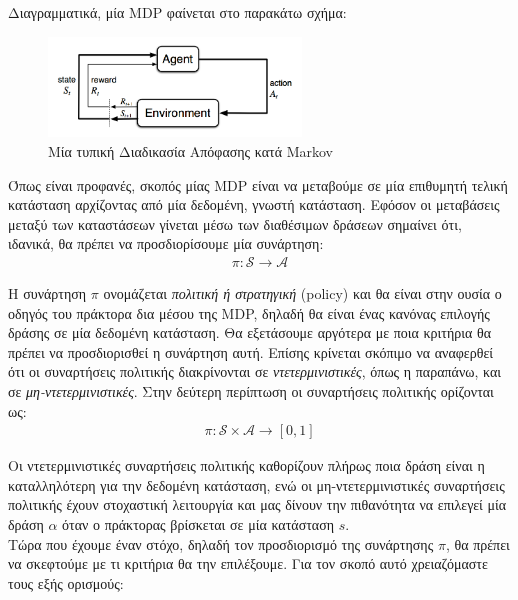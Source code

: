 \documentclass[11pt]{article} %
\numberwithin{equation}{subsection}
\begin{document}
Διαγραμματικά, μία MDP φαίνεται στο παρακάτω σχήμα:\\
\begin{figure}[h]
    \centering
    \includegraphics[width=0.6\textwidth]{mdp}
    \caption{Μία τυπική Διαδικασία Απόφασης κατά Markov}
    \label{fig:mdp}
\end{figure}

Όπως είναι προφανές, σκοπός μίας MDP είναι να μεταβούμε σε μία επιθυμητή τελική κατάσταση αρχίζοντας από μία δεδομένη, γνωστή κατάσταση. Εφόσον οι μεταβάσεις μεταξύ των καταστάσεων γίνεται μέσω των διαθέσιμων δράσεων σημαίνει ότι, ιδανικά, θα πρέπει να προσδιορίσουμε μία συνάρτηση:
\begin{align*}
\mathcal{\pi} : \mathcal{S} \rightarrow \mathcal{A}
\end{align*}

Η συνάρτηση $\mathcal{\pi}$ ονομάζεται \textit{πολιτική ή στρατηγική} (policy) και θα είναι στην ουσία ο οδηγός του πράκτορα δια μέσου της MDP, δηλαδή θα είναι ένας κανόνας επιλογής δράσης σε μία δεδομένη κατάσταση. Θα εξετάσουμε αργότερα με ποια κριτήρια θα πρέπει να προσδιορισθεί η συνάρτηση αυτή. Επίσης κρίνεται σκόπιμο να αναφερθεί ότι οι συναρτήσεις πολιτικής διακρίνονται σε \textit{ντετερμινιστικές}, όπως η παραπάνω, και σε \textit{μη-ντετερμινιστικές}. Στην δεύτερη περίπτωση οι συναρτήσεις πολιτικής ορίζονται ως:
\begin{align*}
\mathcal{\pi} : \mathcal{S} \times \mathcal{A} \rightarrow [0,1]
\end{align*}

 Οι ντετερμινιστικές συναρτήσεις πολιτικής καθορίζουν πλήρως ποια δράση είναι η καταλληλότερη για την δεδομένη κατάσταση, ενώ οι μη-ντετερμινιστικές συναρτήσεις πολιτικής έχουν στοχαστική λειτουργία και μας δίνουν την πιθανότητα να επιλεγεί μία δράση $\alpha$ όταν ο πράκτορας βρίσκεται σε μία κατάσταση $s$.\\

Τώρα που έχουμε έναν στόχο, δηλαδή τον προσδιορισμό της συνάρτησης $\mathcal{\pi}$, θα πρέπει να σκεφτούμε με τι κριτήρια θα την επιλέξουμε. Για τον σκοπό αυτό χρειαζόμαστε τους εξής ορισμούς:\\
\end{document}
